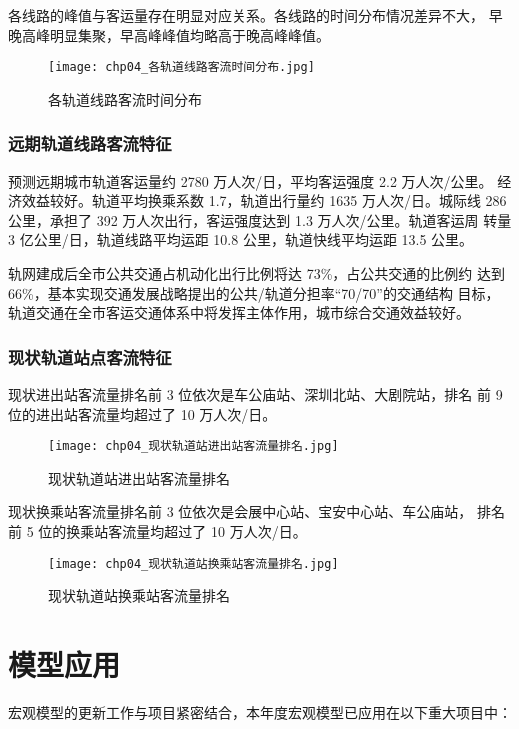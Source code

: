 各线路的峰值与客运量存在明显对应关系。各线路的时间分布情况差异不大，
早晚高峰明显集聚，早高峰峰值均略高于晚高峰峰值。

\begin{figure}[!ht]
  \centering
  \texttt{[image: chp04\_各轨道线路客流时间分布.jpg]}
  \caption{各轨道线路客流时间分布\label{fig:chp04_各轨道线路客流时间分布} }
\end{figure}

\subsubsection{远期轨道线路客流特征}
预测远期城市轨道客运量约 2780 万人次/日，平均客运强度 2.2 万人次/公里。
经济效益较好。轨道平均换乘系数 1.7，轨道出行量约 1635 万人次/日。城际线
286 公里，承担了 392 万人次出行，客运强度达到 1.3 万人次/公里。轨道客运周
转量 3 亿公里/日，轨道线路平均运距 10.8 公里，轨道快线平均运距 13.5 公里。

轨网建成后全市公共交通占机动化出行比例将达 73\%，占公共交通的比例约
达到 66\%，基本实现交通发展战略提出的公共/轨道分担率“70/70”的交通结构
目标，轨道交通在全市客运交通体系中将发挥主体作用，城市综合交通效益较好。

\subsubsection{现状轨道站点客流特征}
现状进出站客流量排名前 3 位依次是车公庙站、深圳北站、大剧院站，排名
前 9 位的进出站客流量均超过了 10 万人次/日。

\begin{figure}[!ht]
  \centering
  \texttt{[image: chp04\_现状轨道站进出站客流量排名.jpg]}
  \caption{现状轨道站进出站客流量排名\label{fig:chp04_现状轨道站进出站客流量排名} }
\end{figure}

现状换乘站客流量排名前 3 位依次是会展中心站、宝安中心站、车公庙站，
排名前 5 位的换乘站客流量均超过了 10 万人次/日。

\begin{figure}[!ht]
  \centering
  \texttt{[image: chp04\_现状轨道站换乘站客流量排名.jpg]}
  \caption{现状轨道站换乘站客流量排名\label{fig:chp04_现状轨道站换乘站客流量排名} }
\end{figure}

\section{模型应用}
宏观模型的更新工作与项目紧密结合，本年度宏观模型已应用在以下重大项目中：

